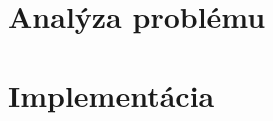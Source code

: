 \documentclass[12pt,a4paper]{report}
\let\openright=\clearpage
\def\chapwithtoc#1{
\chapter*{#1}
\addcontentsline{toc}{chapter}{#1}
}
\begin{document}
\newpage


\openright
\pagestyle{plain}
\setcounter{page}{5}
\tableofcontents



\part{Analýza problému}


\part{Implementácia}









\begin{appendices}


\end{appendices}


\openright
\end{document}

